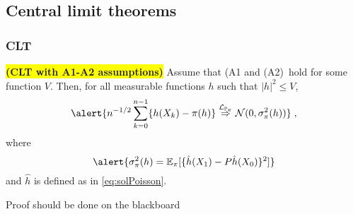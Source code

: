 \documentclass[usenames,dvipsnames]{beamer}
\newcommand\mycolthree[1]{{\color{Emerald}#1}}
\newcommand\colbox[1]{\colorbox{Yellow}{#1}}
\begin{document}
\subsection{Central limit theorems}
\begin{frame}
    \frametitle{CLT}
    \begin{theorem}{\colbox{\bf (CLT with A1-A2 assumptions)}} \label{thm:clrHairer}
        Assume that (A1 and (A2)\ hold for some function $V$. \pause Then, for all measurable functions $h$ such that $|h|^2\leq V$,
          \begin{align*}
            \alert{n^{-1/2} \sum_{k=0}^{n-1} \{h(X_k)-\pi(h)\}  \dlim{\PP_\pi} \gauss(0,\sigma_\pi^2(h))} \eqsp ,
          \end{align*}
          where
          \begin{equation}
          \label{eq:equality-variance}
          \alert{\sigma_\pi^2(h) = \PE_\pi[ \{\hat{h}(X_1)-P\hat{h}(X_0)\}^2]} %
          \end{equation}
        and $\hat h$ is defined as in \eqref{eq:solPoisson}.
        \end{theorem}
        
        \mycolthree{Proof should be done on the blackboard} 

\end{frame}
\end{document}
